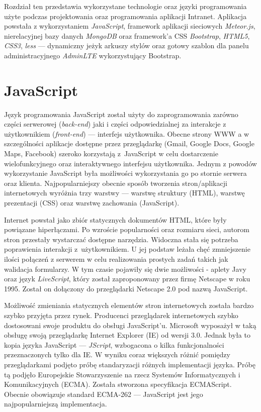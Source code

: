 Rozdział ten przedstawia wykorzystane technologie oraz języki programowania użyte podczas projektowania oraz programowania aplikacji Intranet. Aplikacja powstała z wykorzystaniem \emph{JavaScript}, framework aplikacji sieciowych \emph{Meteor.js}, nierelacyjnej bazy danych  \emph{MongoDB} oraz framework'a CSS \emph{Bootstrap}, \emph{HTML5}, \emph{CSS3}, \emph{less} --- dynamiczny jeżyk arkuszy stylów oraz gotowy szablon dla panelu administracyjnego \emph{AdminLTE} wykorzystujący Bootstrap.

\section{JavaScript}

Język programowania JavaScript został użyty do zaprogramowania zarówno części serwerowej (\textit{back-end}) jaki i części odpowiedzialnej za interakcje z użytkownikiem (\textit{front-end}) --- interfejs użytkownika. Obecne strony WWW a w szczególności aplikacje dostępne przez przeglądarkę (Gmail, Google Docs, Google Maps, Facebook) szeroko korzystają z~JavaScript w celu dostarczenie wielofunkcyjnego oraz interaktywnego interfejsu użytkownika. Jednym z powodów wykorzystanie JavaScript była możliwości wykorzystania go po stornie serwera oraz klienta. Najpopularniejszy obecnie sposób tworzenia stron/aplikacji internetowych wyróżnia trzy warstwy --- warstwę struktury (HTML), warstwę prezentacji (CSS) oraz warstwę zachowania (JavaScript)\cite{stefanov10}.

Internet powstał jako zbiór statycznych dokumentów HTML, które były powiązane hiperłączami. Po wzroście popularności oraz rozmiaru sieci, autorom stron przestały wystarczać dostępne narzędzia. Widoczna stała się potrzeba poprawienia interakcji z~użytkownikiem. U jej podstaw leżała chęć zmniejszenie ilości połączeń z serwerem w celu realizowania prostych zadań takich jak walidacja formularzy. W tym czasie pojawiły się dwie możliwości - aplety Javy oraz język \emph{LiveScript}, który został zaproponowany przez firmę Netscape w roku 1995. Został on dołączony do przeglądarki Netscape 2.0 pod nazwą JavaScript\cite{stefanov10}.  

Możliwość zmieniania statycznych elementów stron internetowych została bardzo szybko przyjęta przez rynek. Producenci przeglądarek internetowych szybko dostosowani swoje produktu do obsługi JavaScript'u. Microsoft wyposażył w taką obsługę swoją przeglądarkę Internet Explorer (IE) od wersji 3.0. Jednak była to kopia języka JavaScript --- \emph{JScript}, wzbogacona o kilka funkcjonalności przeznaczonych tylko dla IE. W wyniku coraz większych różnić pomiędzy przeglądarkami podjęto próbę standaryzacji różnych implementacji języka. Próbę tą podjęło Europejskie Stowarzyszenie na rzecz Systemów Informatycznych i Komunikacyjnych (ECMA). Została stworzona specyfikacja ECMAScript. Obecnie obowiązuje standard ECMA-262\cite{ecmascriptWiki} --- JavaScript jest jego najpopularniejszą implementacja.  


